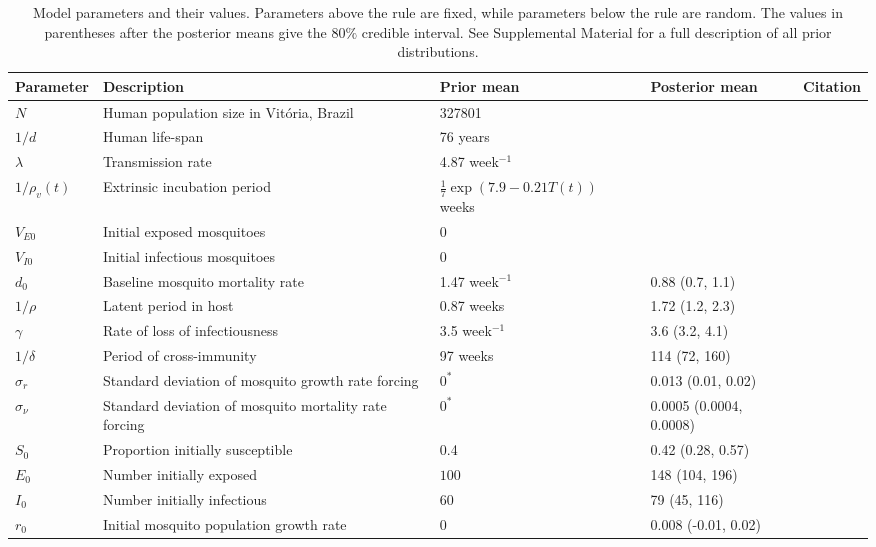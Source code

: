\documentclass[10pt,letterpaper]{article}
\begin{document}
\begin{table}[!ht]
\label{parameters}
\begin{adjustwidth}{-2.25in}{0in} 
\begin{center}
\caption{Model parameters and their values.  Parameters above the rule are fixed, while parameters below the rule are random.  The values in parentheses after the posterior means give the 80$\%$ credible interval. See Supplemental Material for a full description of all prior distributions.}
\begin{tabular}{lp{6cm}lll}
Parameter & Description & Prior mean & Posterior mean & Citation\\
\hline
$N$ & Human population size in Vit\'oria, Brazil & 327801 & & \cite{vitpop} \\
$1/d$ & Human life-span & 76 years & &\cite{vitlong} \\
$\lambda$ & Transmission rate & 4.87 week$^{-1}$ & & \cite{Scott2000}\\
$1/\rho_{v}(t)$ & Extrinsic incubation period & $\frac{1}{7}\exp\left(7.9 - 0.21 T(t) \right)$ weeks & & \cite{Chan2012}\\
$V_{E0}$ & Initial exposed mosquitoes &  0 & &\\
$V_{I0}$ & Initial infectious mosquitoes & 0 & &\\
\hline
$d_0$ & Baseline mosquito mortality rate & 1.47 week$^{-1}$ & 0.88 (0.7, 1.1) &  \cite{Brady2013} \\
$1/\rho$ & Latent period in host & 0.87 weeks  & 1.72 (1.2, 2.3) &  \cite{Chan2012}\\
$\gamma$ & Rate of loss of infectiousness & 3.5 week$^{-1}$ & 3.6 (3.2, 4.1) & \cite{Nguyet2013}\\
$1/\delta$ & Period of cross-immunity & 97 weeks &  114 (72, 160) & \cite{Reich2013}\\
$\sigma_r$ & Standard deviation of mosquito growth rate forcing & $0^*$ & 0.013 (0.01, 0.02) &\\
$\sigma_{\nu}$ & Standard deviation of mosquito mortality rate forcing & $0^*$ & 0.0005 (0.0004, 0.0008) & \\
$S_0$ & Proportion initially susceptible & 0.4 & 0.42 (0.28, 0.57)& \cite{Cardoso2011a} \\
$E_0$ & Number initially exposed & $100$ & 148 (104, 196) & \\
$I_0$ & Number initially infectious & $60$ & 79 (45, 116) &\\
$r_0$ & Initial mosquito population growth rate & 0 & 0.008 (-0.01, 0.02) &\\

\end{tabular}
\end{center}
\end{adjustwidth}
\end{table}
\end{document}
